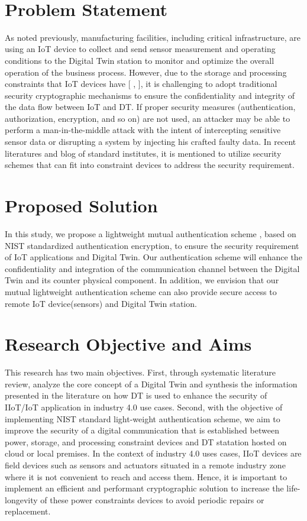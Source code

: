 \
\section{Problem Statement}
As noted previously, manufacturing facilities, including critical infrastructure, are using an IoT device to collect and send sensor measurement and operating conditions to the Digital Twin station to monitor and optimize the overall operation of the business process. However, due to the storage and processing constraints that IoT devices have [ \cite{williams_survey_2022}, \cite{noauthor_lightweight_nodate}], it is challenging to adopt traditional security cryptographic mechanisms to ensure the confidentiality and integrity of the data flow between IoT and DT. If proper security measures (authentication, authorization, encryption, and so on) are not used, an attacker may be able to perform a man-in-the-middle attack with the intent of intercepting sensitive sensor data or disrupting a system by injecting his crafted faulty data\cite{salimBlockchainEnabledSecureDigital2022}. In recent literatures and blog of standard institutes, it is mentioned to utilize security schemes that can fit into constraint devices to address the security requirement.  

\section{Proposed Solution}
In this study, we propose a lightweight mutual authentication scheme , based on NIST standardized authentication encryption, to ensure the security requirement of IoT applications and Digital Twin. Our authentication scheme will enhance the confidentiality and integration of the communication channel between the Digital Twin and its counter physical component. In addition, we envision that our mutual lightweight authentication scheme can also provide secure access to remote IoT device(sensors) and  Digital Twin station. 

\section{Research Objective and Aims}
This research has two main objectives. First, through systematic literature review, analyze the core concept of a Digital Twin and synthesis the information presented in the literature on how DT is used to enhance the security of IIoT/IoT application in industry 4.0 use cases. Second, with the objective of implementing NIST standard light-weight authentication scheme, we aim to improve the security of a digital communication that is established between power, storage, and processing constraint devices and DT statation hosted on cloud or local premises. In the context of industry 4.0 uses cases,  IIoT devices are field devices such as sensors and actuators situated in a remote industry zone where it is not convenient to reach and access them. Hence, it is important to implement an efficient and performant cryptographic solution to increase the life-longevity of these power constraints devices to avoid periodic repairs or replacement.  


